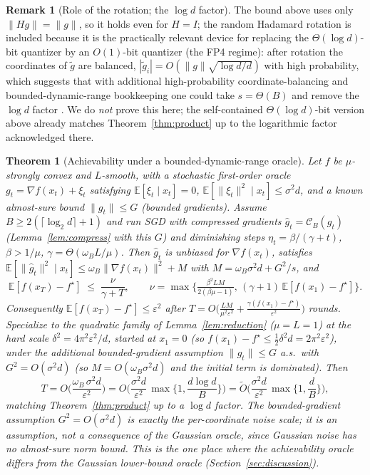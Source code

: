 \documentclass[11pt]{article}
\newtheorem{theorem}{Theorem}
\theoremstyle{definition}
\newtheorem{remark}{Remark}
\newcommand{\E}{\mathbb{E}}
\newcommand{\eps}{\varepsilon}
\newcommand{\Ccal}{\mathcal{C}}
\begin{document}
\begin{remark}[Role of the rotation; the $\log d$ factor]
The bound above uses only $\|Hg\|=\|g\|$, so it holds even for $H=I$; the random Hadamard rotation is
included because it is the practically relevant device for replacing the $\Theta(\log d)$-bit quantizer
by an $O(1)$-bit quantizer (the FP4 regime): after rotation the coordinates of $\tilde g$ are balanced,
$|\tilde g_i|=O(\|g\|\sqrt{\log d/d})$ with high probability, which suggests that with additional
high-probability coordinate-balancing and bounded-dynamic-range bookkeeping one could take
$s=\Theta(B)$ and remove the $\log d$ factor \citep{suresh2017dme,ailon2009fast,alistarh2017qsgd}. We do
\emph{not} prove this here; the self-contained $\Theta(\log d)$-bit version above already matches
Theorem~\ref{thm:product} up to the logarithmic factor acknowledged there.
\end{remark}

\begin{theorem}[Achievability under a bounded-dynamic-range oracle]
\label{thm:upper}
Let $f$ be $\mu$-strongly convex and $L$-smooth, with a stochastic first-order oracle
$g_t=\nabla f(x_t)+\xi_t$ satisfying $\E[\xi_t\mid x_t]=0$, $\E[\|\xi_t\|^2\mid x_t]\le\sigma^2 d$, and a
known almost-sure bound $\|g_t\|\le G$ (bounded gradients). Assume $B\ge 2(\lceil\log_2 d\rceil+1)$ and
run SGD with compressed gradients $\hat g_t=\Ccal_B(g_t)$ (Lemma~\ref{lem:compress} with this $G$) and
diminishing steps $\eta_t=\beta/(\gamma+t)$, $\beta>1/\mu$, $\gamma=\Theta(\omega_B L/\mu)$. Then $\hat g_t$
is unbiased for $\nabla f(x_t)$, satisfies $\E[\|\hat g_t\|^2\mid x_t]\le\omega_B\|\nabla f(x_t)\|^2+M$
with $M=\omega_B\sigma^2 d+G^2/s$, and \citep[Thm.~4.7]{bottou2018optimization}
\[
  \E[f(x_T)-f^\star]\;\le\;\frac{\nu}{\gamma+T},\qquad
  \nu=\max\Big\{\tfrac{\beta^2 L M}{2(\beta\mu-1)},\,(\gamma+1)\,\E[f(x_1)-f^\star]\Big\}.
\]
Consequently $\E[f(x_T)-f^\star]\le\eps^2$ after
$T=O\big(\tfrac{LM}{\mu^2\eps^2}+\tfrac{\gamma(f(x_1)-f^\star)}{\eps^2}\big)$ rounds. Specialize to the
quadratic family of Lemma~\ref{lem:reduction} ($\mu=L=1$) at the hard scale $\delta^2=4\pi^2\eps^2/d$,
started at $x_1=0$ (so $f(x_1)-f^\star\le\tfrac12\delta^2 d=2\pi^2\eps^2$), \emph{under the additional
bounded-gradient assumption} $\|g_t\|\le G$ a.s.\ with $G^2=O(\sigma^2 d)$ (so $M=O(\omega_B\sigma^2 d)$
and the initial term is dominated). Then
\[
  T=O\!\Big(\frac{\omega_B\,\sigma^2 d}{\eps^2}\Big)
  =O\!\Big(\frac{\sigma^2 d}{\eps^2}\,\max\!\Big\{1,\frac{d\log d}{B}\Big\}\Big)
  =\widetilde O\!\Big(\frac{\sigma^2 d}{\eps^2}\,\max\!\Big\{1,\frac dB\Big\}\Big),
\]
matching Theorem~\ref{thm:product} up to a $\log d$ factor. The bounded-gradient assumption $G^2=O(\sigma^2 d)$
is exactly the per-coordinate noise scale; it is an \emph{assumption}, not a consequence of the Gaussian
oracle, since Gaussian noise has no almost-sure norm bound. This is the one place where the achievability
oracle differs from the Gaussian lower-bound oracle (Section~\ref{sec:discussion}).
\end{theorem}
\end{document}
